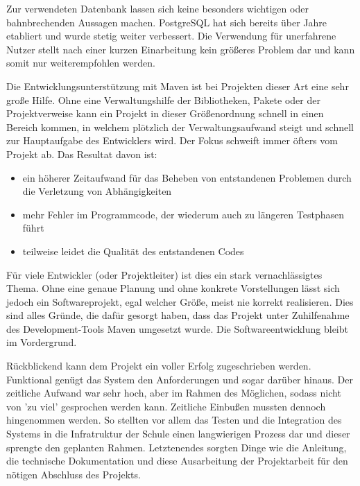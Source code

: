 Zur verwendeten Datenbank lassen sich keine besonders wichtigen oder bahnbrechenden Aussagen machen. PostgreSQL hat sich bereits über Jahre etabliert und wurde stetig weiter verbessert. 
Die Verwendung für unerfahrene Nutzer stellt nach einer kurzen Einarbeitung kein größeres Problem dar und kann somit nur weiterempfohlen werden. 
 
Die Entwicklungsunterstützung mit Maven ist bei Projekten dieser Art eine sehr große Hilfe.
Ohne eine Verwaltungshilfe der Bibliotheken, Pakete oder der Projektverweise kann ein Projekt in dieser Größenordnung schnell in einen Bereich kommen, in welchem plötzlich der Verwaltungsaufwand steigt und schnell zur Hauptaufgabe des Entwicklers wird.
Der Fokus schweift immer öfters vom Projekt ab. Das Resultat davon ist:
\begin{itemize}
	\item ein höherer Zeitaufwand für das Beheben von entstandenen Problemen durch die Verletzung von Abhängigkeiten 
	\item mehr Fehler im Programmcode, der wiederum auch zu längeren Testphasen führt
	\item teilweise leidet die Qualität des entstandenen Codes 
\end{itemize}
Für viele Entwickler (oder Projektleiter) ist dies ein stark vernachlässigtes Thema.
Ohne eine genaue Planung und ohne konkrete Vorstellungen lässt sich jedoch ein Softwareprojekt, egal welcher Größe, meist nie korrekt realisieren.  
Dies sind alles Gründe, die dafür gesorgt haben, dass das Projekt unter Zuhilfenahme des Development-Tools Maven umgesetzt wurde.
Die Softwareentwicklung bleibt im Vordergrund.

Rückblickend kann dem Projekt ein voller Erfolg zugeschrieben werden.
Funktional genügt das System den Anforderungen und sogar darüber hinaus. Der zeitliche Aufwand war sehr hoch, aber im Rahmen des Möglichen, sodass nicht von 'zu viel' gesprochen werden kann.
Zeitliche Einbußen mussten dennoch hingenommen werden. So stellten vor allem das Testen und die Integration des Systems in die Infratruktur der Schule einen langwierigen Prozess dar und dieser sprengte den geplanten Rahmen.
Letztenendes sorgten Dinge wie die Anleitung, die technische Dokumentation und diese Ausarbeitung der Projektarbeit für den nötigen Abschluss des Projekts.
